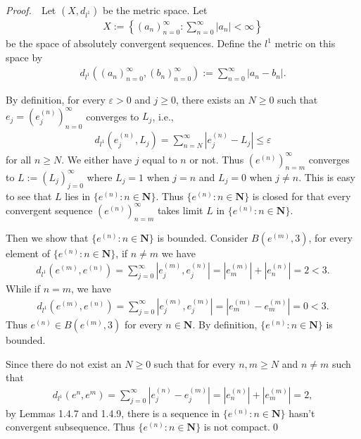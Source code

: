 \documentclass{book}
\newcommand{\pff}{\vspace{.25em}\noindent\emph{Proof.}~~}
\begin{document}
\pff Let $(X,d_{l^1})$ be the metric space. Let
    \begin{align*}
        X:=\left\{(a_n)_{n=0}^{\infty}:\sum_{n=0}^{\infty}|a_n|<\infty\right\}
    \end{align*}
be the space of absolutely convergent sequences. Define the $l^1$ metric on this space by
    \begin{align*}
        d_{l^1}((a_n)_{n=0}^{\infty},(b_n)_{n=0}^{\infty}):=\sum_{n=0}^{\infty}|a_n-b_n|.
    \end{align*}

By definition, for every $\varepsilon>0$ and $j\geq 0$, there exists an $N\geq 0$ such that $e_j=(e^{(n)}_j)_{n=0}^{\infty}$ converges to $L_j$, i.e.,
    \begin{align*}
        d_{l^1}(e^{(n)}_j,L_j)=\sum_{n=N}^{\infty}|e^{(n)}_j-L_j|\leq\varepsilon
    \end{align*}
for all $n\geq N$. We either have $j$ equal to $n$ or not. Thus $(e^{(n)})_{n=m}^{\infty}$ converges to $L:=(L_j)_{j=0}^{\infty}$ where $L_j=1$ when $j=n$ and $L_j=0$ when $j\neq n$. This is easy to see that $L$ lies in $\{e^{(n)}:n\in\mathbf{N}\}$. Thus $\{e^{(n)}:n\in\mathbf{N}\}$ is closed for that every convergent sequence $(e^{(n)})_{n=m}^{\infty}$ takes limit $L$ in $\{e^{(n)}:n\in\mathbf{N}\}$.

Then we show that $\{e^{(n)}:n\in\mathbf{N}\}$ is bounded. Consider $B(e^{(m)},3)$, for every element of $\{e^{(n)}:n\in\mathbf{N}\}$, if $n\neq m$ we have
    \begin{align*}
        d_{l^1}(e^{(m)},e^{(n)})=\sum_{j=0}^{\infty}|e^{(m)}_j,e^{(n)}_j|=|e^{(m)}_m|+|e^{(n)}_n|=2<3.
    \end{align*}
While if $n=m$, we have
    \begin{align*}
        d_{l^1}(e^{(m)},e^{(n)})=\sum_{j=0}^{\infty}|e^{(m)}_j,e^{(m)}_j|=|e^{(m)}_m-e^{(m)}_m|=0<3.
    \end{align*}
Thus $e^{(n)}\in B(e^{(m)},3)$ for every $n\in\mathbf{N}$. By definition, $\{e^{(n)}:n\in\mathbf{N}\}$ is bounded.

Since there do not exist an $N\geq 0$ such that for every $n,m\geq N$ and $n\neq m$ such that
    \begin{align*}
        d_{l^1}(e^{n},e^{m})=\sum_{j=0}^{\infty}|e^{(n)}_j-e^{(m)}_j|=|e^{(n)}_n|+|e^{(m)}_m|=2,
    \end{align*}
by Lemmas 1.4.7 and 1.4.9, there is a sequence in $\{e^{(n)}:n\in\mathbf{N}\}$ hasn't convergent subsequence. Thus $\{e^{(n)}:n\in\mathbf{N}\}$ is not compact.\qed
\end{document}
